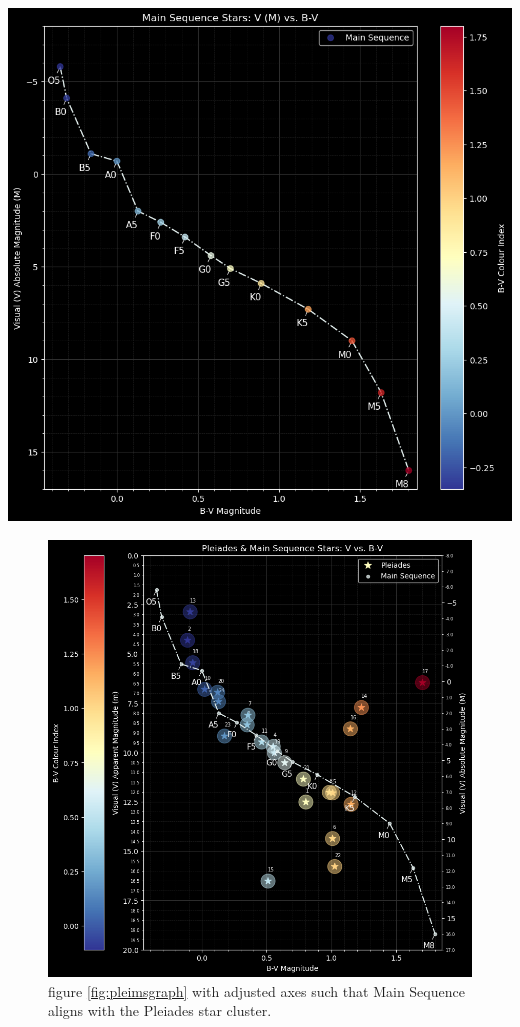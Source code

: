 \documentclass[12pt]{article}
\begin{document}
\begin{minipage}{.5\textwidth}
    \captionsetup{hypcap=false}
    \centering
    \includegraphics[width=\linewidth]{ms graph.png}
    \label{fig:msgraph}
\end{minipage}

\begin{figure}[H]
    \centering
    \includegraphics[width=12.5cm]{20 axis pleims.png}
    \caption{\centering figure \ref{fig:pleimsgraph} with adjusted axes such that Main Sequence aligns with the Pleiades star cluster.}
    \label{fig:adjgraph}
\end{figure}
\end{document}
